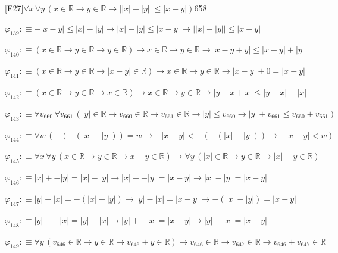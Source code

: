 \begin{fullproof}{[E27]}{$\forall x\,\forall y\,(x \in \mathbb{R} \to y \in \mathbb{R} \to \lvert \lvert x \rvert - \lvert y \rvert \rvert \leq \lvert x - y \rvert)$}{658}
\begin{abbrevlist}
\item $\varphi_{139} :\equiv -\lvert x - y \rvert \leq \lvert x \rvert - \lvert y \rvert \to \lvert x \rvert - \lvert y \rvert \leq \lvert x - y \rvert \to \lvert \lvert x \rvert - \lvert y \rvert \rvert \leq \lvert x - y \rvert$
\item $\varphi_{140} :\equiv (x \in \mathbb{R} \to y \in \mathbb{R} \to y \in \mathbb{R}) \to x \in \mathbb{R} \to y \in \mathbb{R} \to \lvert x - y + y \rvert \leq \lvert x - y \rvert + \lvert y \rvert$
\item $\varphi_{141} :\equiv (x \in \mathbb{R} \to y \in \mathbb{R} \to \lvert x - y \rvert \in \mathbb{R}) \to x \in \mathbb{R} \to y \in \mathbb{R} \to \lvert x - y \rvert + 0 = \lvert x - y \rvert$
\item $\varphi_{142} :\equiv (x \in \mathbb{R} \to y \in \mathbb{R} \to x \in \mathbb{R}) \to x \in \mathbb{R} \to y \in \mathbb{R} \to \lvert y - x + x \rvert \leq \lvert y - x \rvert + \lvert x \rvert$
\item $\varphi_{143} :\equiv \forall v_{660}\,\forall v_{661}\,(\lvert y \rvert \in \mathbb{R} \to v_{660} \in \mathbb{R} \to v_{661} \in \mathbb{R} \to \lvert y \rvert \leq v_{660} \to \lvert y \rvert + v_{661} \leq v_{660} + v_{661})$
\item $\varphi_{144} :\equiv \forall w\,(-(-(\lvert x \rvert - \lvert y \rvert)) = w \to -\lvert x - y \rvert < -(-(\lvert x \rvert - \lvert y \rvert)) \to -\lvert x - y \rvert < w)$
\item $\varphi_{145} :\equiv \forall x\,\forall y\,(x \in \mathbb{R} \to y \in \mathbb{R} \to x - y \in \mathbb{R}) \to \forall y\,(\lvert x \rvert \in \mathbb{R} \to y \in \mathbb{R} \to \lvert x \rvert - y \in \mathbb{R})$
\item $\varphi_{146} :\equiv \lvert x \rvert + -\lvert y \rvert = \lvert x \rvert - \lvert y \rvert \to \lvert x \rvert + -\lvert y \rvert = \lvert x - y \rvert \to \lvert x \rvert - \lvert y \rvert = \lvert x - y \rvert$
\item $\varphi_{147} :\equiv \lvert y \rvert - \lvert x \rvert = -(\lvert x \rvert - \lvert y \rvert) \to \lvert y \rvert - \lvert x \rvert = \lvert x - y \rvert \to -(\lvert x \rvert - \lvert y \rvert) = \lvert x - y \rvert$
\item $\varphi_{148} :\equiv \lvert y \rvert + -\lvert x \rvert = \lvert y \rvert - \lvert x \rvert \to \lvert y \rvert + -\lvert x \rvert = \lvert x - y \rvert \to \lvert y \rvert - \lvert x \rvert = \lvert x - y \rvert$
\item $\varphi_{149} :\equiv \forall y\,(v_{646} \in \mathbb{R} \to y \in \mathbb{R} \to v_{646} + y \in \mathbb{R}) \to v_{646} \in \mathbb{R} \to v_{647} \in \mathbb{R} \to v_{646} + v_{647} \in \mathbb{R}$

\end{abbrevlist}
\end{fullproof}
